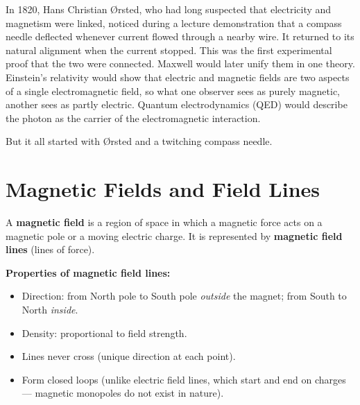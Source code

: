 In 1820, Hans Christian \O{}rsted, who had long suspected that
electricity and magnetism were linked, noticed during a lecture
demonstration that a compass needle deflected whenever current flowed
through a nearby wire. It returned to its natural alignment when the
current stopped. This was the first experimental proof that the two
were connected. Maxwell would later unify them in one theory.
Einstein's relativity would show that electric and magnetic fields are
two aspects of a single electromagnetic field, so what one observer
sees as purely magnetic, another sees as partly electric. Quantum
electrodynamics (QED) would describe the photon as the carrier of the
electromagnetic interaction.

But it all started with \O{}rsted and a twitching
compass needle.

\section{Magnetic Fields and Field Lines}

\begin{definitionbox}
A \textbf{magnetic field} is a region of space in
which a magnetic force acts on a magnetic pole or
a moving electric charge. It is represented by
\textbf{magnetic field lines} (lines of force).

\textbf{Properties of magnetic field lines:}
\begin{itemize}[noitemsep]
  \item Direction: from North pole to South pole
  \textit{outside} the magnet; from South to North
  \textit{inside}.
  \item Density: proportional to field strength.
  \item Lines never cross (unique direction at each point).
  \item Form closed loops (unlike electric field lines,
  which start and end on charges --- magnetic monopoles
  do not exist in nature).
\end{itemize}
\end{definitionbox}

